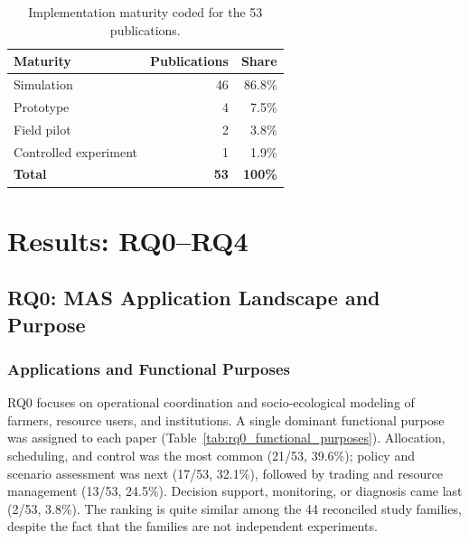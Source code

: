 \documentclass[11pt,a4paper]{article}
\begin{document}
\begin{table}[htbp]
\centering
\small
\caption{Implementation maturity coded for the 53 publications.}
\label{tab:implementation_maturity}
\begin{tabular}{lrr}
\toprule
\textbf{Maturity} & \textbf{Publications} & \textbf{Share} \\
\midrule
Simulation & 46 & 86.8\% \\
Prototype & 4 & 7.5\% \\
Field pilot & 2 & 3.8\% \\
Controlled experiment & 1 & 1.9\% \\
\midrule
\textbf{Total} & \textbf{53} & \textbf{100\%} \\
\bottomrule
\end{tabular}
\end{table}



\section{Results: RQ0--RQ4}


\subsection{RQ0: MAS Application Landscape and Purpose}

\subsubsection{Applications and Functional Purposes}

RQ0 focuses on operational coordination and socio-ecological modeling
of farmers, resource users, and institutions. A single dominant functional purpose was assigned to each paper (Table~\ref{tab:rq0_functional_purposes}).
Allocation, scheduling, and control was the most common (21/53, 39.6\%);
policy and scenario assessment was next (17/53, 32.1\%), followed by
trading and resource management (13/53, 24.5\%). Decision support,
monitoring, or diagnosis came last (2/53, 3.8\%). The ranking is quite
similar among the 44 reconciled study families, despite the fact that the
families are not independent experiments.
\end{document}
